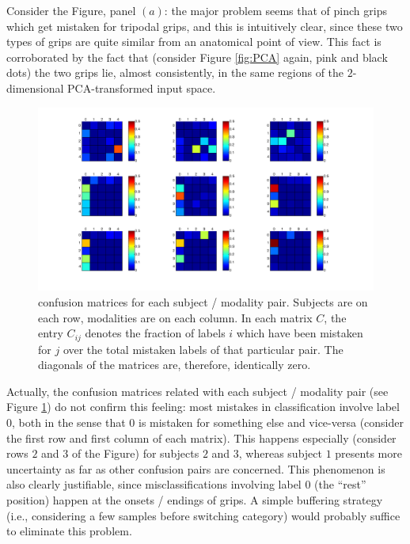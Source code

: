 Consider the Figure, panel $(a)$: the major problem seems that of
pinch grips which get mistaken for tripodal grips, and this is
intuitively clear, since these two types of grips are quite similar
from an anatomical point of view. This fact is corroborated by the
fact that (consider Figure \ref{fig:PCA} again, pink and black dots)
the two grips lie, almost consistently, in the same regions of the
$2$-dimensional PCA-transformed input space.

\begin{figure}[!ht] \centering
  \includegraphics[width=\textwidth]{figs/confusion}
  \caption{confusion matrices for each subject / modality
    pair. Subjects are on each row, modalities are on each column. In
    each matrix $C$, the entry $C_{ij}$ denotes the fraction of labels
    $i$ which have been mistaken for $j$ over the total mistaken
    labels of that particular pair. The diagonals of the matrices are,
    therefore, identically zero.}
  \label{fig:confusion}
\end{figure}

Actually, the confusion matrices related with each subject / modality
pair (see Figure \ref{fig:confusion}) do not confirm this feeling:
most mistakes in classification involve label $0$, both in the sense
that $0$ is mistaken for something else and vice-versa (consider the
first row and first column of each matrix). This happens especially
(consider rows $2$ and $3$ of the Figure) for subjects $2$ and $3$,
whereas subject $1$ presents more uncertainty as far as other
confusion pairs are concerned. This phenomenon is also clearly
justifiable, since misclassifications involving label $0$ (the
``rest'' position) happen at the onsets / endings of grips. A simple
buffering strategy (i.e., considering a few samples before switching
category) would probably suffice to eliminate this problem.

